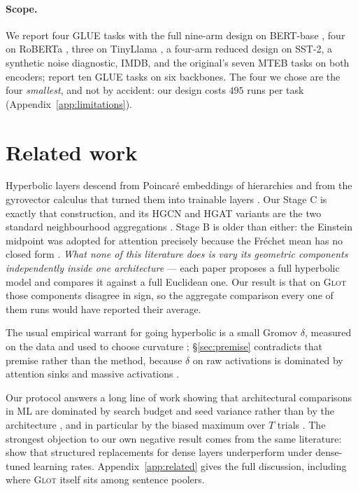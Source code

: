 \documentclass{article}
\begin{document}
\paragraph{Scope.} We report four GLUE tasks with the full nine-arm design on
BERT-base \citep{devlin2019bert}, four on RoBERTa \citep{liu2019roberta}, three
on TinyLlama \citep{zhang2024tinyllama}, a four-arm reduced design on SST-2, a
synthetic noise diagnostic, IMDB, and the original's seven MTEB tasks on both
encoders; \citet{mantri2026glot} report ten GLUE tasks on
six backbones. The four we chose are the four \emph{smallest}, and not by
accident: our design costs $495$ runs per task
(Appendix~\ref{app:limitations}).

\section{Related work}
\label{sec:related}

Hyperbolic layers descend from Poincar\'e embeddings of hierarchies
\citep{nickel2017poincare,nickel2018lorentz} and from the gyrovector calculus
that turned them into trainable layers
\citep{ganea2018hyperbolic,shimizu2021hnnpp}. Our Stage C is exactly that
construction, and its HGCN and HGAT variants are the two standard neighbourhood
aggregations \citep{chami2019hgcn,zhang2019hgat}. Stage B is older than either:
the Einstein midpoint was adopted for attention precisely because the
Fr\'echet mean has no closed form \citep{gulcehre2018hyperbolicattention}.
\emph{What none of this literature does is vary its geometric components
independently inside one architecture} --- each paper proposes a full hyperbolic
model and compares it against a full Euclidean one. Our result is that on
\textsc{Glot} those components disagree in sign, so the aggregate comparison
every one of them runs would have reported their average.

The usual empirical warrant for going hyperbolic is a small Gromov $\delta$,
measured on the data and used to choose curvature
\citep{khrulkov2020hyperbolicimage,tifrea2018poincareglove}; \S\ref{sec:premise}
contradicts that premise rather than the method, because $\delta$ on raw
activations is dominated by attention sinks and massive activations
\citep{xiao2024attentionsinks,sun2024massiveactivations}.

Our protocol answers a long line of work showing that architectural comparisons
in ML are dominated by search budget and seed variance rather than by the
architecture
\citep{reimers2017scoredistributions,melis2018stateoftheart,lucic2018gans,musgrave2020realitycheck,narang2021modifications},
and in particular by the biased maximum over $T$ trials
\citep{dodge2019showyourwork}. The strongest objection to our own negative
result comes from the same literature: \citet{qiu2024computebetterspent} show
that structured replacements for dense layers underperform under dense-tuned
learning rates. Appendix~\ref{app:related} gives the full discussion, including
where \textsc{Glot} itself sits among sentence poolers.
\end{document}
